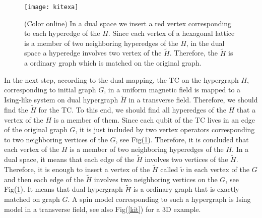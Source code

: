 \documentclass[preprintnumbers, showpacs, floatfix,twocolumn,
preprintnumbers, superscriptaddress]{revtex4}
\begin{document}
\begin{figure}[t]
\centering
\texttt{[image: kitexa]}
\caption{(Color online) In a dual space we insert a red vertex corresponding to each hyperedge of the $H$. Since each vertex of a hexagonal lattice is a member of two neighboring hyperedges of the $H$, in the dual space a hyperedge involves two vertex of the $\tilde{H}$. Therefore, the $\tilde{H}$ is a ordinary graph which is matched on the original graph.} \label{kitexa}
\end{figure}
In the next step, according to the dual mapping, the TC on the hypergraph $H$, corresponding to initial graph $G$, in a uniform magnetic field is mapped to a Ising-like system on dual hypergraph $\tilde{H}$ in a transverse field. Therefore, we should find the $\tilde{H}$ for the TC. To this end, we should find all hyperedges of the $H$ that a vertex of the $H$ is a member of them. Since each qubit of the TC lives in an edge of the original graph $G$, it is just included by two vertex operators corresponding to two neighboring vertices of the $G$, see Fig(\ref{kitexa}). Therefore, it is concluded that each vertex of the $H$ is a member of two neighboring hyperedges of the $H$. In a dual space, it means that each edge of the $\tilde{H}$ involves two vertices of the $\tilde{H}$. Therefore, it is enough to insert a vertex of the $\tilde{H}$ called $\tilde{v}$ in each vertex of the $G$ and then each edge of the $\tilde{H}$ involves two neighboring vertices on the $G$, see Fig(\ref{kitexa}). It means that dual hypergraph $\tilde{H}$ is a ordinary graph that is exactly matched on graph $G$. A spin model corresponding to such a hypergraph is Ising model in a transverse field, see also Fig(\ref{kit}) for a 3D example.
\end{document}
